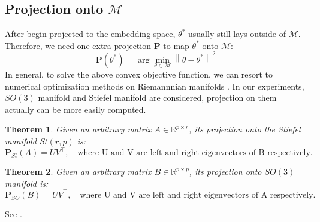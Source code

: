\documentclass{article} %
\newtheorem{theorem}{Theorem}
\newenvironment{proof}[1][Proof]{\begin{trivlist}
\item[\hskip \labelsep {\bfseries #1}]}{\end{trivlist}}
\begin{document}
\subsection{Projection onto $\mathcal{M}$}
After begin projected to the embedding space, $\theta^*$ usually still lays outside of $\mathcal{M}$. Therefore, we need one extra projection $\mathbf{P}$ to map $\theta^*$ onto $\mathcal{M}$:
\begin{equation}
	\mathbf{P}(\theta^*)=\arg\min_{\theta\in\mathcal{M}}\left\|\theta-\theta^* \right\|^2 
\end{equation}
In general, to solve the above convex objective function, we can resort to numerical optimization methods on 
Riemannnian manifolds \cite{optimization_manifold}. 
In our experiments, $SO(3)$ manifold and Stiefel manifold are considered,  projection on them actually can be more easily computed. 
\begin{theorem}
	Given an arbitrary matrix $A\in\mathbb{R}^{p\times r}$, its projection onto the Stiefel manifold $St(r,p)$ is:
	\begin{equation}
		\mathbf{P}_{St} (A)=UV^{\top}, \quad  \text{where U and  V are left and right eigenvectors of B respectively}. 
	\end{equation}
\end{theorem}
\begin{theorem}
	Given an arbitrary matrix $B\in\mathbb{R}^{p\times p}$, its projection onto $SO(3)$ manifold is:
	\begin{equation}
		\mathbf{P}_{SO} (B)=UV^{\top}, \quad  \text{where U and  V are left and right eigenvectors of A respectively}. 
	\end{equation}
\end{theorem}

\begin{proof}
	See \cite{projection_M}. 
\end{proof}
\end{document}
